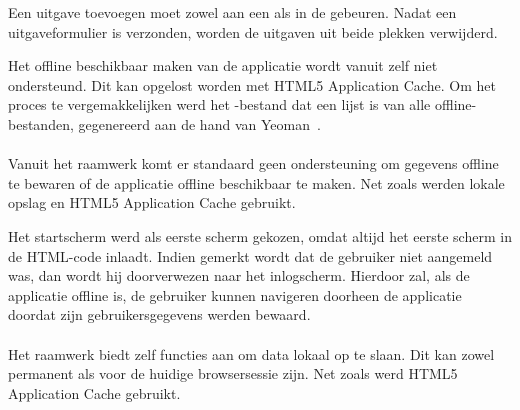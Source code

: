 Een uitgave toevoegen moet zowel aan een  als in de  gebeuren.
Nadat een uitgaveformulier is verzonden, worden de uitgaven uit beide plekken verwijderd.

Het offline beschikbaar maken van de applicatie wordt vanuit \kendo{} zelf niet ondersteund.
Dit kan opgelost worden met HTML5 Application Cache.
Om het proces te vergemakkelijken werd het -bestand dat een lijst is van alle offline-bestanden, gegenereerd aan de hand van Yeoman~\cite{Yeoman2013}.

\paragraph{\jqm}
Vanuit het raamwerk komt er standaard geen ondersteuning om gegevens offline te bewaren of de applicatie offline beschikbaar te maken.
Net zoals \kendo{} werden lokale opslag en HTML5 Application Cache gebruikt.

Het startscherm werd als eerste scherm gekozen, omdat \jqm{} altijd het eerste scherm in de HTML-code inlaadt.
Indien gemerkt wordt dat de gebruiker niet aangemeld was, dan wordt hij doorverwezen naar het inlogscherm.
Hierdoor zal, als de applicatie offline is, de gebruiker kunnen navigeren doorheen de applicatie doordat zijn gebruikersgegevens werden bewaard.

\paragraph{\lungo}
Het raamwerk biedt zelf functies aan om data lokaal op te slaan.
Dit kan zowel permanent als voor de huidige browsersessie zijn.
Net zoals \kendo{} werd HTML5 Application Cache gebruikt.